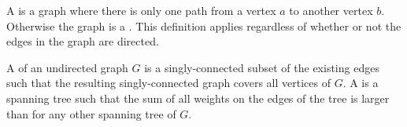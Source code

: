 \begin{defi}
A  is a graph where there is only one path from a vertex $a$ to another vertex $b$. Otherwise the graph is a . This definition applies regardless of whether or not the edges in the graph are directed.
\cite{Barber2011}
\end{defi}

\begin{defi}
A  of an undirected graph $G$ is a singly-connected subset of the existing edges such that the resulting singly-connected graph covers all vertices of $G$. A  is a spanning tree such that the sum of all weights on the edges of the tree is larger than for any other spanning tree of $G$.
\cite{Barber2011}
\end{defi}